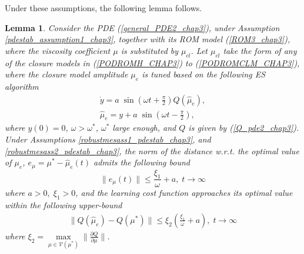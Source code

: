 \documentclass[letterpaper,conference,onecolumn,11pt]{IEEEtran}
\newtheorem{lemma}{Lemma}
\begin{document}
Under these assumptions, the following lemma follows.
\begin{lemma}\label{pdestab_lemma1_chap3}
Consider the PDE (\ref{general_PDE2_chap3}), under Assumption
\ref{pdestab_assumption1_chap3}, together with its ROM model
(\ref{ROM3_chap3}), where the viscosity coefficient $\mu$ is
substituted by $\mu_{cl}$. Let $\mu_{cl}$ take the form of any of
the closure models in (\ref{PODROMH_CHAP3}) to
(\ref{PODROMCLM_CHAP3}), where the closure model amplitude
$\mu_{e}$ is tuned based on the following ES algorithm
\begin{equation}
\begin{array}{l}
\dot{y}=a\;\sin(\omega t+\frac{\pi}{2})Q(\hat\mu_{e}),\\
\hat{\mu}_{e}=y+a\;\sin(\omega t-\frac{\pi}{2}),
\label{pdestab_mes_1_chap3}
\end{array}
\end{equation}
where $y(0)=0$, $\omega>\omega^{*}$, $\omega^{*}$ large enough,
and $Q$ is given by (\ref{Q_pde2_chap3}). Under Assumptions
\ref{robustmesass1_pdestab_chap3}, and
\ref{robustmesass2_pdestab_chap3}, the norm of the distance w.r.t.
the optimal value of $\mu_{e}$,
 $e_{\mu}=\mu^{*}-{\hat\mu}_{e}(t)$ admits the following bound
\begin{equation}
\|e_{\mu}(t)\|\leq\frac{\xi_{1}}{\omega}+a,\;t\rightarrow\infty
\label{pdestab_mes_bound1_chap3}
\end{equation}
where $a>0,\;\xi_{1}>0$, and the learning cost function approaches
its optimal value within the following upper-bound\
\begin{equation}
\begin{array}{l}
\|Q({\hat\mu}_{e})-Q(\mu^{*})\|\leq\xi_{2}(\frac{\xi_{1}}{\omega}+a),\;t\rightarrow\infty
\end{array}\label{pdestab_mes_bound2_chap3}
\end{equation}
where $\xi_{2}=\underset{\mu\in\mathcal{V}(\mu^{*})}\max
\|\frac{\partial{Q}}{\partial\mu} \|$.
\end{lemma}
\end{document}
